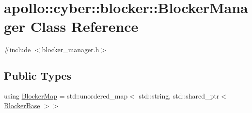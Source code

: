 \hypertarget{classapollo_1_1cyber_1_1blocker_1_1BlockerManager}{\section{apollo\-:\-:cyber\-:\-:blocker\-:\-:Blocker\-Manager Class Reference}
\label{classapollo_1_1cyber_1_1blocker_1_1BlockerManager}
}


{\ttfamily \#include $<$blocker\-\_\-manager.\-h$>$}

\subsection*{Public Types}
\begin{DoxyCompactItemize}
\item 
using \hyperlink{classapollo_1_1cyber_1_1blocker_1_1BlockerManager_aab93de92687db46229801f733c741334}{Blocker\-Map} = std\-::unordered\-\_\-map$<$ std\-::string, std\-::shared\-\_\-ptr$<$ \hyperlink{classapollo_1_1cyber_1_1blocker_1_1BlockerBase}{Blocker\-Base} $>$$>$
\end{DoxyCompactItemize}
